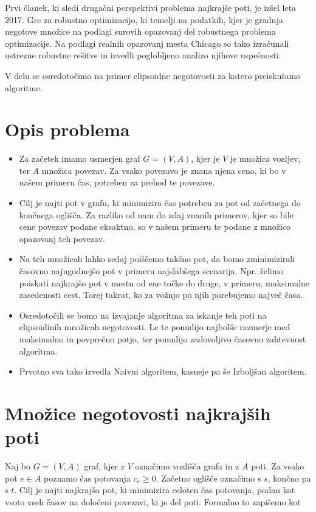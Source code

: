 \documentclass[a4paper, 12 pt]{article}
\theoremstyle{definition} %
\theoremstyle{plain} %
\theoremstyle{definition}
\begin{document}
Prvi članek, ki sledi drugačni perspektivi problema najkrajše poti, je izšel leta 2017. Gre za robustno optimizacijo, ki temelji na podatkih, kjer je gradnja negotove množice na podlagi surovih opazovanj del robustnega problema optimizacije. Na podlagi realnih opazovanj mesta Chicago so tako izračunali ustrezne robustne rešitve in izvedli poglobljeno analizo njihove uspešnosti. \newline

V delu se osredotočimo na primer elipsoidne negotovosti za katero preiskušamo algoritme. 


\section{Opis problema}
\begin{itemize}
\item{Za začetek imamo usmerjen graf $ G = (V, A)$, kjer je $V$ je množica vozljev, ter $A$ množica povezav. Za vsako povezavo je znana njena ceno, ki bo v našem primeru čas, potreben za prehod te povezave.}
\item{Cilj je najti pot v grafu, ki minimizira čas potreben za pot od začetnega do končnega oglišča. Za razliko od nam do zdaj znanih primerov, kjer so bile cene povezav podane eksaktno, so v našem primeru te podane z množico opazovanj teh povezav.}
\item{Na teh množicah lahko sedaj poiščemo takšno pot, da bomo zminimizirali časovno najugodnejšo pot v primeru najslabšega scenarija. Npr. želimo poiskati najkrajšo pot v mestu od ene točke do druge, v primeru, maksimalne zasedenosti cest. Torej takrat, ko za vožnjo po njih porebujemo največ časa.}
\item{Osredotočili se bomo na izvajanje algoritma za iskanje teh poti na elipsoidinih množicah negotovosti. Le te ponudijo najbolše razmerje med maksimalno in povprečno potjo, ter ponudijo zadovoljivo časovno zahtevnost algoritma.}
\item{Prvotno sva tako izvedla Naivni algoritem, kasneje pa še Izboljšan algoritem.}
\end{itemize}


\section{Množice negotovosti najkrajših poti}

Naj bo $G = (V, A)$ graf, kjer z $V$ označimo vozlišča grafa in z $A$ poti. Za vsako pot $e\in A$ poznamo čas potovanja $c_{e} \ge 0$. Začetno oglišče označimo s $s$, končno pa s $t$.
Cilj je najti najkrajšo pot, ki minimizira celoten čas potovanja, podan kot vsoto vseh časov na določeni povezavi, ki je del poti. Formalno to zapišemo kot
\end{document}
